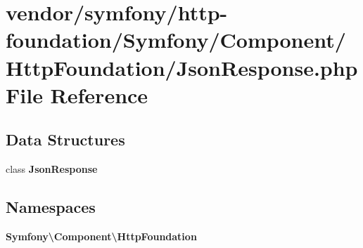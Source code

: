 \section{vendor/symfony/http-\/foundation/\+Symfony/\+Component/\+Http\+Foundation/\+Json\+Response.php File Reference}
\label{symfony_2http-foundation_2_symfony_2_component_2_http_foundation_2_json_response_8php}
\subsection*{Data Structures}
\begin{DoxyCompactItemize}
\item 
class {\bf Json\+Response}
\end{DoxyCompactItemize}
\subsection*{Namespaces}
\begin{DoxyCompactItemize}
\item 
 {\bf Symfony\textbackslash{}\+Component\textbackslash{}\+Http\+Foundation}
\end{DoxyCompactItemize}
